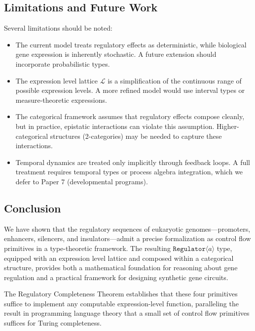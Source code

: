 \documentclass[12pt,a4paper]{article}
\newcommand{\Reg}[1]{\texttt{Regulator}\ensuremath{\langle}#1\ensuremath{\rangle}}
\begin{document}
\subsection{Limitations and Future Work}

Several limitations should be noted:

\begin{itemize}
  \item The current model treats regulatory effects as deterministic, while biological gene expression is inherently stochastic.  A future extension should incorporate probabilistic types.

  \item The expression level lattice $\mathcal{L}$ is a simplification of the continuous range of possible expression levels.  A more refined model would use interval types or measure-theoretic expressions.

  \item The categorical framework assumes that regulatory effects compose cleanly, but in practice, epistatic interactions can violate this assumption.  Higher-categorical structures (2-categories) may be needed to capture these interactions.

  \item Temporal dynamics are treated only implicitly through feedback loops.  A full treatment requires temporal types or process algebra integration, which we defer to Paper 7 (developmental programs).
\end{itemize}

\subsection{Conclusion}

We have shown that the regulatory sequences of eukaryotic genomes---promoters, enhancers, silencers, and insulators---admit a precise formalization as control flow primitives in a type-theoretic framework.  The resulting $\Reg{a}$ type, equipped with an expression level lattice and composed within a categorical structure, provides both a mathematical foundation for reasoning about gene regulation and a practical framework for designing synthetic gene circuits.

The Regulatory Completeness Theorem establishes that these four primitives suffice to implement any computable expression-level function, paralleling the result in programming language theory that a small set of control flow primitives suffices for Turing completeness.
\end{document}
